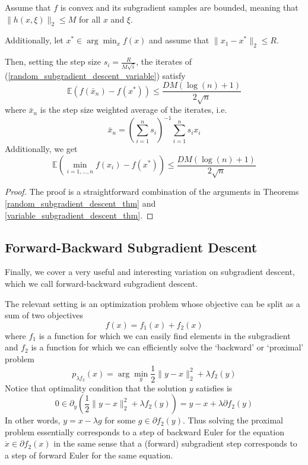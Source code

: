 \begin{theorem}
 Assume that $f$ is convex and its subgradient samples are bounded, 
 meaning that $\|h(x,\xi)\|_2 \leq M$ for all $x$ and $\xi$.
 
 Additionally, let $x^*\in \arg\min_x f(x)$ and assume that $\|x_1 - x^*\|_2 \leq R$. 
 
 Then, setting the step size $s_i = \frac{R}{M\sqrt{i}}$,
 the iterates of (\ref{random_subgradient_descent_variable}) satisfy
 \begin{equation}
  \mathbb{E}(f(\bar{x}_n) - f(x^*)) \leq \frac{DM(\log(n) + 1)}{2\sqrt{n}}
 \end{equation}
 where $\bar{x}_n$ is the step size weighted average of the iterates, i.e.
 \begin{equation}
  \bar{x}_n = \left(\displaystyle\sum_{i = 1}^n s_i\right)^{-1} \displaystyle\sum_{i=1}^n s_ix_i
 \end{equation}
 Additionally, we get
 \begin{equation}
  \mathbb{E}\left(\min_{i=1,...,n} f(x_i) - f(x^*)\right) \leq \frac{DM(\log(n) + 1)}{2\sqrt{n}}
 \end{equation}
 
\end{theorem}
\begin{proof}
 The proof is a straightforward combination of the arguments in Theorems \ref{random_subgradient_descent_thm} and
 \ref{variable_subgradient_descent_thm}.
\end{proof}

\subsection{Forward-Backward Subgradient Descent}
Finally, we cover a very useful and interesting variation on subgradient descent, which we call
forward-backward subgradient descent. 

The relevant setting is an optimization problem whose objective can be
split as a sum of two objectives
\begin{equation}\label{split_problem}
 f(x) = f_1(x) + f_2(x)
\end{equation}
where $f_1$ is a function for which we can easily find elements in the subgradient and $f_2$ is a function for
which we can efficiently solve the `backward' or `proximal' problem
\begin{equation}
 p_{\lambda f_2}(x) = \arg\min_{y} \frac{1}{2}\|y - x\|_2^2 + \lambda f_2(y)
\end{equation}
Notice that optimality condition that the solution $y$ satisfies is
$$0\in \partial_y\left(\frac{1}{2}\|y - x\|_2^2 + \lambda f_2(y)\right) = y - x + \lambda\partial f_2(y)
$$
In other words, $y = x - \lambda g$ for some $g\in \partial f_2(y)$. Thus solving the proximal problem
essentially corresponds to a step of backward Euler for the equation $\dot{x} \in \partial f_2(x)$ in the
same sense that a (forward) subgradient step corresponds to a step of forward Euler for the same equation.

